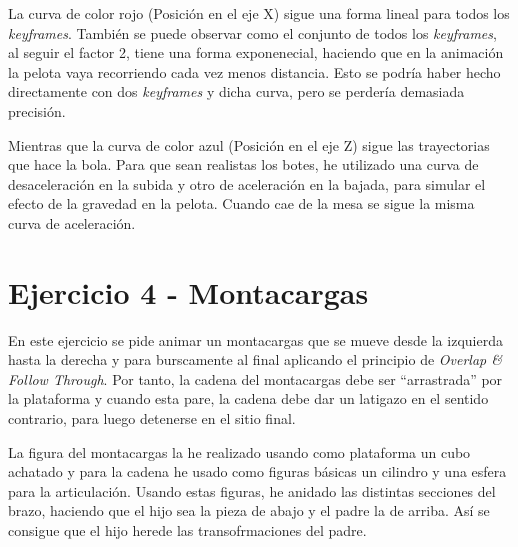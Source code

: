 \documentclass{article}
\begin{document}
La curva de color rojo (Posición en el eje X) sigue una forma lineal para todos los \textit{keyframes}. También se puede observar como el conjunto de todos los \textit{keyframes}, al seguir el factor 2, tiene una forma exponenecial, haciendo que en la animación la pelota vaya recorriendo cada vez menos distancia. 
Esto se podría haber hecho directamente con dos \textit{keyframes} y dicha curva, pero se perdería demasiada precisión. %

Mientras que la curva de color azul (Posición en el eje Z) sigue las trayectorias que hace la bola. Para que sean realistas los botes, he utilizado una curva de desaceleración en la subida y otro de aceleración en la bajada, para simular el efecto de la gravedad en la pelota. Cuando cae de la mesa se sigue la misma curva de aceleración.

\section{Ejercicio 4 - Montacargas}

En este ejercicio se pide animar un montacargas que se mueve desde la izquierda hasta la derecha y para burscamente al final aplicando el principio de \textit{Overlap \& Follow Through}. Por tanto, la cadena del montacargas debe ser ``arrastrada'' por la plataforma y cuando esta pare, la cadena debe dar un latigazo en el sentido contrario, para luego detenerse en el sitio final.

La figura del montacargas la he realizado usando como plataforma un cubo achatado y para la cadena he usado como figuras básicas un cilindro y una esfera para la articulación. Usando estas figuras, he anidado las distintas secciones del brazo, haciendo que el hijo sea la pieza de abajo y el padre la de arriba. Así se consigue que el hijo herede las transofrmaciones del padre.
\end{document}
